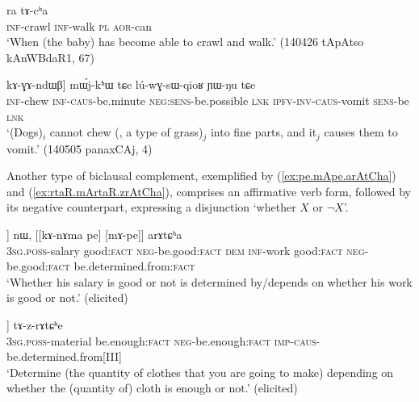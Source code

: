 \begin{exe}
\ex \label{ex:kAnWrtsW.kANke.ra.tAcha}
\gll [kɤ-nɯrtsɯ] [kɤ-ŋke] ra tɤ-cʰa \\
\textsc{inf}-crawl \textsc{inf}-walk \textsc{pl} \textsc{aor}-can \\
\glt `When (the baby) has become able to crawl and walk.' (140426 tApAtso kAnWBdaR1, 67)
\end{exe} 

\begin{exe}
\ex \label{ex:kAndza.kAGAndWB}
\gll [[kɤ-ndza] kɤ-ɣɤ-ndɯβ] mɯ́j-kʰɯ tɕe lú-wɣ-sɯ-qioʁ ɲɯ-ŋu tɕe \\
\textsc{inf}-chew \textsc{inf}-\textsc{caus}-be.minute \textsc{neg}:\textsc{sens}-be.possible \textsc{lnk} \textsc{ipfv}-\textsc{inv}-\textsc{caus}-vomit \textsc{sens}-be \textsc{lnk} \\
\glt `(Dogs)$_i$ cannot chew (, a type of grass)$_j$ into fine parts, and it$_j$ causes them to vomit.' (140505 panaxCAj, 4)
\end{exe} 

Another type of biclausal complement, exemplified by (\ref{ex:pe.mApe.arAtCha}) and (\ref{ex:rtaR.mArtaR.zrAtCha}), comprises an affirmative verb form, followed by its negative counterpart, expressing a disjunction `whether $X$ or $\lnot X$'.

\begin{exe} 
\ex \label{ex:pe.mApe.arAtCha}
\gll  [[ɯ-ngra pe] [mɤ-pe]] nɯ, [[kɤ-nɤma pe] [mɤ-pe]] arɤtɕʰa \\
\textsc{3sg}.\textsc{poss}-salary good:\textsc{fact} \textsc{neg}-be.good:\textsc{fact} \textsc{dem} \textsc{inf}-work good:\textsc{fact} \textsc{neg}-be.good:\textsc{fact} be.determined.from:\textsc{fact} \\
\glt `Whether his salary is good or not is determined by/depends on whether his work is good or not.' (elicited)
\end{exe} 

\begin{exe} 
\ex \label{ex:rtaR.mArtaR.zrAtCha}
\gll  [[ɯ-spa rtaʁ] [mɤ-rtaʁ]] tɤ-z-rɤtɕʰe \\
\textsc{3sg}.\textsc{poss}-material be.enough:\textsc{fact} \textsc{neg}-be.enough:\textsc{fact} \textsc{imp}-\textsc{caus}-be.determined.from[III] \\
\glt `Determine (the quantity of clothes that you are going to make) depending on whether the (quantity of) cloth is enough or not.' (elicited)
\end{exe}

